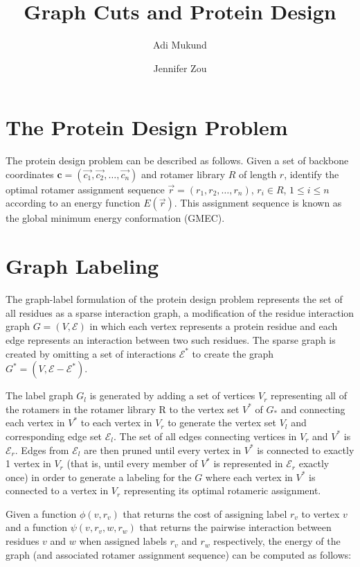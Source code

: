 \documentclass[11pt]{article}
\title{\textbf{Graph Cuts and Protein Design}}
\author{Adi Mukund \and Jennifer Zou}
\date{}
\begin{document}
	\maketitle
	
	\section{The Protein Design Problem}
	
	The protein design problem can be described as follows. Given a set of 
	backbone coordinates $\mathbf{c} = (\vec{c_1}, \vec{c_2 }, \dots, \vec{c_n})$
	and rotamer library $R$ of length $r$, identify the optimal rotamer
	assignment sequence $\vec{r} = (r_1, r_2,\dots, r_n)$, $r_i \in R$, 
	$1 \leq i \leq n$ according to an energy function $E(\vec{r})$. This assignment
	sequence is known as the global minimum energy conformation (GMEC). 
	
	\section{Graph Labeling}
	
	The graph-label formulation of the protein design problem represents the set
	of all residues as a sparse interaction graph, a modification of the residue
	interaction graph $G = (V, \mathcal{E})$ in which each vertex represents a
	protein residue and each edge represents an interaction between two such
	residues. The sparse graph is created by omitting a set of interactions
	$\mathcal{E}^*$ to create the graph $G^* = (V, \mathcal{E}-\mathcal{E}^*)$.
	
	The label graph $G_l$ is generated by adding a set of vertices $V_r$ 
	representing all of the rotamers in the rotamer library R to the vertex
	set $V^*$ of $G_*$ and connecting each vertex in $V^*$ to each vertex in
	$V_r$ to generate the vertex set $V_l$ and corresponding edge set
	$\mathcal{E}_l$. The set of all edges connecting vertices in $V_r$ and $V^*$
	is $\mathcal{E}_r$. Edges from $\mathcal{E}_l$ are then pruned until every 
	vertex in $V^*$ is connected to exactly 1 vertex in $V_r$ (that is, until 
	every member of $V^*$ is represented in $\mathcal{E}_r$ exactly once) in
	order to generate a labeling for the $G$ where each vertex in $V^*$ is 
	connected to a vertex in $V_r$ representing its optimal rotameric assignment.  
	
	Given a function $\phi(v, r_v)$ that returns the cost of assigning label $r_v$
	to vertex $v$ and a function $\psi(v, r_v, w, r_w)$ that returns the pairwise
	interaction between residues $v$ and $w$ when assigned labels $r_v$ and $r_w$
	respectively, the energy of the graph (and associated rotamer assignment 
	sequence) can be computed as follows:
	
\end{document}
